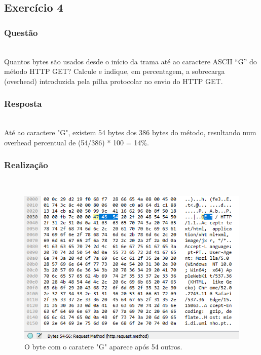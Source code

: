 \documentclass{llncs}
\begin{document}
\clearpage
\subsection{Exercício 4}
\subsubsection{Questão}\rule[-10pt]{0pt}{10pt}\\

Quantos bytes são usados desde o início da trama até ao caractere ASCII “G” do método HTTP GET? Calcule e indique, em percentagem, a sobrecarga (overhead) introduzida pela pilha protocolar no envio do HTTP GET.

\subsubsection{Resposta}\rule[-10pt]{0pt}{10pt}\\

Até ao caractere "G", existem 54 bytes dos 386 bytes do método, resultando num overhead percentual de (54/386) * 100 = 14\%.

\subsubsection{Realização}\rule[-10pt]{0pt}{10pt}\\

\begin{figure}
  \begin{center}
  \includegraphics[scale=0.8]{imagens/HTTPbytes.png} 
  \end{center}
  \caption{O byte com o caratere "G" aparece após 54 outros.}
  \label{fig:http_bytes}
\end{figure} 
\end{document}
